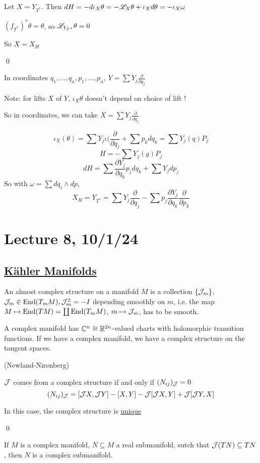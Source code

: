 \documentclass[x11names,reqno,14pt]{extarticle}
\newcommand{\pp}[2]{\frac{\partial #1}{\partial #2}}
\begin{document}
\proof

Let $X = Y_{T^*}$. Then $dH = -d\iota_X\theta = -\mathscr{L}_X\theta + \iota_Xd\theta = -\iota_X\omega$

$(f_{T^*})^*\theta = \theta$, so $\mathscr{L}_{Y_{T^*}}\theta = 0$

So $X = X_H$

\qed

In coordinates $q_1, \dots, q_n, p_1, \dots, p_n$, $Y = \sum Y_j\pp{}{q_j}$

Note: for lifts $X$ of $Y$, $\iota_X\theta$ doesn't depend on choice of lift !

So in coordinates, we can take $X = \sum Y_j\pp{}{q_j}$

\[
\iota_X(\theta) = \sum Y_j\iota(\pp{}{q_j} + \sum p_k dq_k = \sum Y_j(q)P_j
\]
\[
H = -\sum Y_j(g)P_j
\]
\[
dH = \sum\pp{Y_j}{q_k}p_jdq_k + \sum Y_jdp_j
\]
So with $\omega = \sum dq_i \wedge dp$, 
\[
X_H = Y_{T^*} = \sum Y_j\pp{}{q_j} - \sum p_j\pp{Y_j}{q_k}\pp{}{p_k}
\]

\section*{Lecture 8, 10/1/24}

\subsection*{\underline{K\"ahler Manifolds}}

An almost complex structure on a manifold $M$ is a collection $\{\mathcal{J}_m\}$, $\mathcal{J}_m \in {\mathrm{End}}(T_mM), \mathcal{J}_m^2 = -I$ depending smoothly on $m$, i.e. the map $M \mapsto {\mathrm{End}}(TM) = \coprod {\mathrm{End}}(T_mM)$, $m \mapsto \mathcal{J}_m$, has to be smooth. 

A complex manifold has $\mathbb{C}^n \cong \mathbb{R}^{2n}$-valued charts with holomorphic transition functions. If we have a complex manifold, we have a complex structure on the tangent spaces. 

\thm (Newland-Nirenberg)

$\mathcal{J}$ comes from a complex structure if and only if $(N_{ij})_{\mathcal{J}} = 0$
\[
(N_{ij})_{\mathcal{J}} = [\mathcal{J}X,\mathcal{J}Y] - [X, Y] - \mathcal{J}[\mathcal{J}X, Y] + \mathcal{J}[\mathcal{J}Y, X]
\]

In this case, the complex structure is \underline{unique}

\proof

\qed

\cor If $M$ is a complex manifold, $N \subseteq M$ a real submanifold, sutch that $\mathcal{J}(TN) \subseteq TN$, then $N$ is a complex submanifold. 
\end{document}
